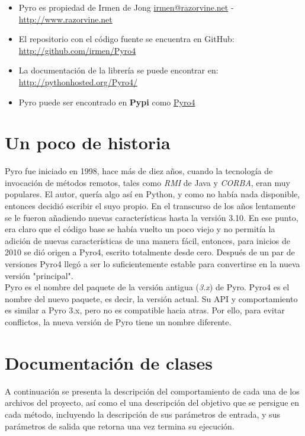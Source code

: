 \documentclass{article}
\begin{document}
\begin{itemize}
\item Pyro es propiedad de Irmen de Jong \href{mailto:irmen@razorvine.net}{irmen@razorvine.net} - \url{http://www.razorvine.net}
\item El repositorio con el código fuente se encuentra en GitHub: \url{http://github.com/irmen/Pyro4}
\item La documentación de la librería se puede encontrar en: \url{http://pythonhosted.org/Pyro4/}
\item Pyro puede ser encontrado en \textbf{Pypi} como \href{https://pypi.python.org/pypi/Pyro4/}{Pyro4}
\end{itemize}

\section{Un poco de historia}
Pyro fue iniciado en 1998, hace más de diez años, cuando la tecnología de invocación de métodos remotos, tales como \textit{RMI} de Java y \textit{CORBA}, eran muy populares. El autor, quería algo así en Python, y como no había nada disponible, entonces decidió escribir el suyo propio. En el transcurso de los años lentamente se le fueron añadiendo nuevas características hasta la versión 3.10. En ese punto, era claro que el código base se había vuelto un poco viejo y no permitía la adición de nuevas características de una manera fácil, entonces, para inicios de 2010 se dió origen a Pyro4, escrito totalmente desde cero. Después de un par de versiones Pyro4 llegó a ser lo suficientemente estable para convertirse en la nueva versión "principal".\\

Pyro es el nombre del paquete de la versión antigua (\textit{3.x}) de Pyro. Pyro4 es el nombre del nuevo paquete, es decir, la versión actual. Su API y comportamiento es similar a Pyro 3.x, pero no es compatible hacia atras. Por ello, para evitar conflictos, la nueva versión de Pyro tiene un nombre diferente.

\section{Documentación de clases}
A continuación se presenta la descripción del comportamiento de cada una de los archivos del proyecto, así como el una descripción del objetivo que se persigue en cada método, incluyendo la descripción de sus parámetros de entrada, y sus parámetros de salida que retorna una vez termina su ejecución.
\end{document}
